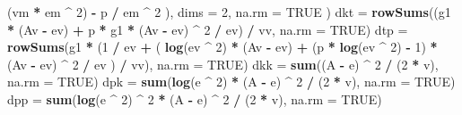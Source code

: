 \documentclass[]{article}
\newenvironment{Shaded}{\begin{snugshade}}{\end{snugshade}}
\newcommand{\DataTypeTok}[1]{\textcolor[rgb]{0.13,0.29,0.53}{#1}}
\newcommand{\DecValTok}[1]{\textcolor[rgb]{0.00,0.00,0.81}{#1}}
\newcommand{\KeywordTok}[1]{\textcolor[rgb]{0.13,0.29,0.53}{\textbf{#1}}}
\newcommand{\NormalTok}[1]{#1}
\newcommand{\OperatorTok}[1]{\textcolor[rgb]{0.81,0.36,0.00}{\textbf{#1}}}
\newcommand{\OtherTok}[1]{\textcolor[rgb]{0.56,0.35,0.01}{#1}}
\newcommand{\StringTok}[1]{\textcolor[rgb]{0.31,0.60,0.02}{#1}}
\begin{document}
\begin{Shaded}
\begin{Highlighting}[]
\StringTok{          }\NormalTok{(vm }\OperatorTok{*}\StringTok{ }\NormalTok{em }\OperatorTok{^}\StringTok{ }\DecValTok{2}\NormalTok{) }\OperatorTok{-}\StringTok{ }\NormalTok{p }\OperatorTok{/}\StringTok{ }\NormalTok{em }\OperatorTok{^}\StringTok{ }\DecValTok{2}
\NormalTok{      ),}
    \DataTypeTok{dims =} \DecValTok{2}\NormalTok{,}
    \DataTypeTok{na.rm =} \OtherTok{TRUE}
\NormalTok{  )}
\NormalTok{  dkt =}\StringTok{ }\KeywordTok{rowSums}\NormalTok{((g1 }\OperatorTok{*}\StringTok{ }\NormalTok{(Av }\OperatorTok{-}\StringTok{ }\NormalTok{ev) }\OperatorTok{+}\StringTok{ }\NormalTok{p }\OperatorTok{*}\StringTok{ }\NormalTok{g1 }\OperatorTok{*}\StringTok{ }\NormalTok{(Av }\OperatorTok{-}\StringTok{ }\NormalTok{ev) }\OperatorTok{^}\StringTok{ }\DecValTok{2} \OperatorTok{/}\StringTok{ }\NormalTok{ev) }\OperatorTok{/}\StringTok{ }\NormalTok{vv, }\DataTypeTok{na.rm =} \OtherTok{TRUE}\NormalTok{)}
\NormalTok{  dtp =}\StringTok{ }\KeywordTok{rowSums}\NormalTok{(g1 }\OperatorTok{*}\StringTok{ }\NormalTok{(}\DecValTok{1} \OperatorTok{/}\StringTok{ }\NormalTok{ev }\OperatorTok{+}\StringTok{ }\NormalTok{(}
    \KeywordTok{log}\NormalTok{(ev }\OperatorTok{^}\StringTok{ }\DecValTok{2}\NormalTok{) }\OperatorTok{*}\StringTok{ }\NormalTok{(Av }\OperatorTok{-}\StringTok{ }\NormalTok{ev) }\OperatorTok{+}\StringTok{ }\NormalTok{(p }\OperatorTok{*}\StringTok{ }\KeywordTok{log}\NormalTok{(ev }\OperatorTok{^}\StringTok{ }\DecValTok{2}\NormalTok{) }\OperatorTok{-}\StringTok{ }\DecValTok{1}\NormalTok{) }\OperatorTok{*}\StringTok{ }\NormalTok{(Av }\OperatorTok{-}\StringTok{ }\NormalTok{ev) }\OperatorTok{^}\StringTok{ }\DecValTok{2} \OperatorTok{/}\StringTok{ }\NormalTok{ev}
\NormalTok{  ) }\OperatorTok{/}\StringTok{ }\NormalTok{vv),}
  \DataTypeTok{na.rm =} \OtherTok{TRUE}\NormalTok{)}
\NormalTok{  dkk =}\StringTok{ }\KeywordTok{sum}\NormalTok{((A }\OperatorTok{-}\StringTok{ }\NormalTok{e) }\OperatorTok{^}\StringTok{ }\DecValTok{2} \OperatorTok{/}\StringTok{ }\NormalTok{(}\DecValTok{2} \OperatorTok{*}\StringTok{ }\NormalTok{v), }\DataTypeTok{na.rm =} \OtherTok{TRUE}\NormalTok{)}
\NormalTok{  dpk =}\StringTok{ }\KeywordTok{sum}\NormalTok{(}\KeywordTok{log}\NormalTok{(e }\OperatorTok{^}\StringTok{ }\DecValTok{2}\NormalTok{) }\OperatorTok{*}\StringTok{ }\NormalTok{(A }\OperatorTok{-}\StringTok{ }\NormalTok{e) }\OperatorTok{^}\StringTok{ }\DecValTok{2} \OperatorTok{/}\StringTok{ }\NormalTok{(}\DecValTok{2} \OperatorTok{*}\StringTok{ }\NormalTok{v), }\DataTypeTok{na.rm =} \OtherTok{TRUE}\NormalTok{)}
\NormalTok{  dpp =}\StringTok{ }\KeywordTok{sum}\NormalTok{(}\KeywordTok{log}\NormalTok{(e }\OperatorTok{^}\StringTok{ }\DecValTok{2}\NormalTok{) }\OperatorTok{^}\StringTok{ }\DecValTok{2} \OperatorTok{*}\StringTok{ }\NormalTok{(A }\OperatorTok{-}\StringTok{ }\NormalTok{e) }\OperatorTok{^}\StringTok{ }\DecValTok{2} \OperatorTok{/}\StringTok{ }\NormalTok{(}\DecValTok{2} \OperatorTok{*}\StringTok{ }\NormalTok{v), }\DataTypeTok{na.rm =} \OtherTok{TRUE}\NormalTok{)}

\end{Highlighting}
\end{Shaded}
\end{document}
